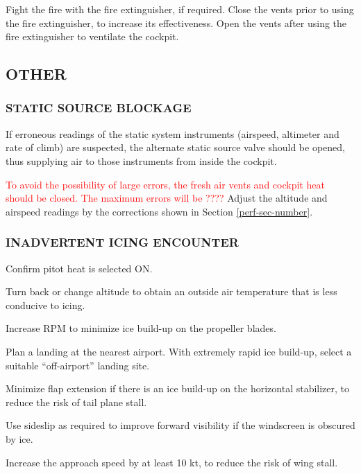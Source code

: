 Fight the fire with the fire extinguisher, if required.  
Close the vents prior to using the fire extinguisher, to increase its effectiveness.
Open the vents after using the fire extinguisher to ventilate the cockpit.

%
%
%

\subsection{OTHER}
\subsubsection{STATIC SOURCE BLOCKAGE}

If erroneous readings of the static system instruments (airspeed, altimeter and rate of climb) are suspected, the
alternate static source valve should be opened, thus supplying air to those instruments from inside the cockpit.

  \textcolor{red}{To avoid the possibility of large errors, the fresh air vents and cockpit heat should be closed. 
The maximum errors will be ????}  Adjust the altitude and airspeed readings by the corrections shown in Section
\ref{perf-sec-number}.

\subsubsection{INADVERTENT ICING ENCOUNTER}
\begin{enumerate*}
  \item Confirm pitot heat is selected ON.
  \item Turn back or change altitude to obtain an outside air temperature that is less conducive to icing.
  \item Increase RPM to minimize ice build-up on the propeller blades.
  \item Plan a landing at the nearest airport.  With extremely rapid ice build-up, select a suitable ``off-airport'' landing site.
  \item Minimize flap extension if there is an ice build-up on the horizontal stabilizer, to reduce the risk of tail plane stall.
  \item Use sideslip as required to improve forward visibility if the windscreen is obscured by ice.
  \item Increase the approach speed by at least 10 kt, to reduce the risk of wing stall.
  \end{enumerate*} 

